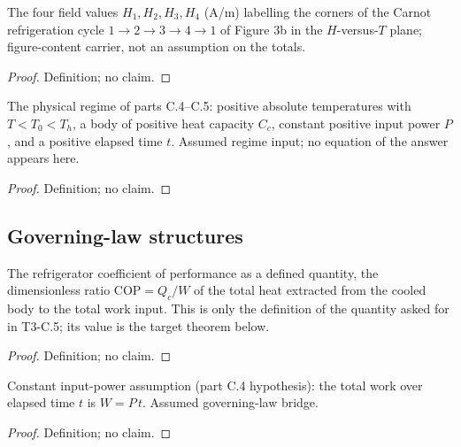 \begin{definition}
\label{def:IPhO2026Problems_problem_IPhO_2026_3_C_5:CycleFields}
The four field values $H_1, H_2, H_3, H_4$ (A/m) labelling the corners of the
Carnot refrigeration cycle $1 \to 2 \to 3 \to 4 \to 1$ of Figure 3b in the
$H$-versus-$T$ plane; figure-content carrier, not an assumption on the totals.
\end{definition}
\begin{proof}
Definition; no claim.
\end{proof}

\begin{definition}
\label{def:IPhO2026Problems_problem_IPhO_2026_3_C_5:RegimeAssumptions}
The physical regime of parts C.4--C.5: positive absolute temperatures with
$T < T_0 < T_h$, a body of positive heat capacity $C_c$, constant positive
input power $P$, and a positive elapsed time $t$. Assumed regime input; no
equation of the answer appears here.
\end{definition}
\begin{proof}
Definition; no claim.
\end{proof}

\subsection*{Governing-law structures}

\begin{definition}
\label{def:IPhO2026Problems_problem_IPhO_2026_3_C_5:coefficientOfPerformance}
The refrigerator coefficient of performance as a defined quantity, the
dimensionless ratio $\mathrm{COP} = Q_c / W$ of the total heat extracted from
the cooled body to the total work input. This is only the definition of the
quantity asked for in T3-C.5; its value is the target theorem below.
\end{definition}
\begin{proof}
Definition; no claim.
\end{proof}

\begin{definition}
\label{def:IPhO2026Problems_problem_IPhO_2026_3_C_5:ConstantPowerWork}
Constant input-power assumption (part C.4 hypothesis): the total work over
elapsed time $t$ is $W = P\,t$. Assumed governing-law bridge.
\end{definition}
\begin{proof}
Definition; no claim.
\end{proof}

